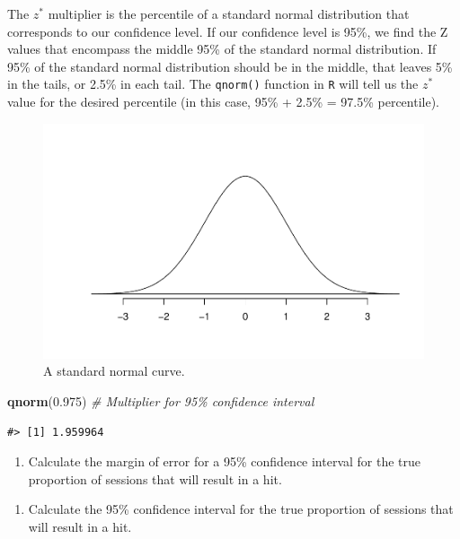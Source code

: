 \documentclass[
]{report}
\newenvironment{Shaded}{\begin{snugshade}}{\end{snugshade}}
\newcommand{\CommentTok}[1]{\textcolor[rgb]{0.56,0.35,0.01}{\textit{#1}}}
\newcommand{\FloatTok}[1]{\textcolor[rgb]{0.00,0.00,0.81}{#1}}
\newcommand{\FunctionTok}[1]{\textcolor[rgb]{0.13,0.29,0.53}{\textbf{#1}}}
\newcommand{\NormalTok}[1]{#1}
\providecommand{\tightlist}{%
  \setlength{\itemsep}{0pt}\setlength{\parskip}{0pt}}
\begin{document}
The \(z^*\) multiplier is the percentile of a standard normal distribution that corresponds to our confidence level. If our confidence level is 95\%, we find the Z values that encompass the middle 95\% of the standard normal distribution. If 95\% of the standard normal distribution should be in the middle, that leaves 5\% in the tails, or 2.5\% in each tail. The \texttt{qnorm()} function in \texttt{R} will tell us the \(z^*\) value for the desired percentile (in this case, 95\% + 2.5\% = 97.5\% percentile).

\begin{figure}

{\centering \includegraphics[width=0.5\linewidth]{05-UR-module4_review_files/figure-latex/Ncurve-1} 

}

\caption{A standard normal curve.}\label{fig:Ncurve}
\end{figure}

\begin{Shaded}
\begin{Highlighting}[]
\FunctionTok{qnorm}\NormalTok{(}\FloatTok{0.975}\NormalTok{) }\CommentTok{\# Multiplier for 95\% confidence interval}
\end{Highlighting}
\end{Shaded}

\begin{verbatim}
#> [1] 1.959964
\end{verbatim}

\begin{enumerate}
\def\labelenumi{\arabic{enumi}.}
\setcounter{enumi}{11}
\tightlist
\item
  Calculate the margin of error for a 95\% confidence interval for the true proportion of sessions that will result in a hit.
\end{enumerate}

\vspace{0.6in}

\begin{enumerate}
\def\labelenumi{\arabic{enumi}.}
\setcounter{enumi}{12}
\tightlist
\item
  Calculate the 95\% confidence interval for the true proportion of sessions that will result in a hit.
\end{enumerate}
\end{document}
